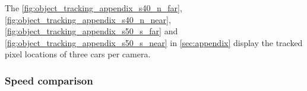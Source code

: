 The 
\autoref{fig:object_tracking_appendix_s40_n_far}, 
\autoref{fig:object_tracking_appendix_s40_n_near}, 
\autoref{fig:object_tracking_appendix_s50_s_far} and 
\autoref{fig:object_tracking_appendix_s50_s_near} in \autoref{sec:appendix} display the tracked pixel locations of three cars per camera.

\subsubsection{Speed comparison}